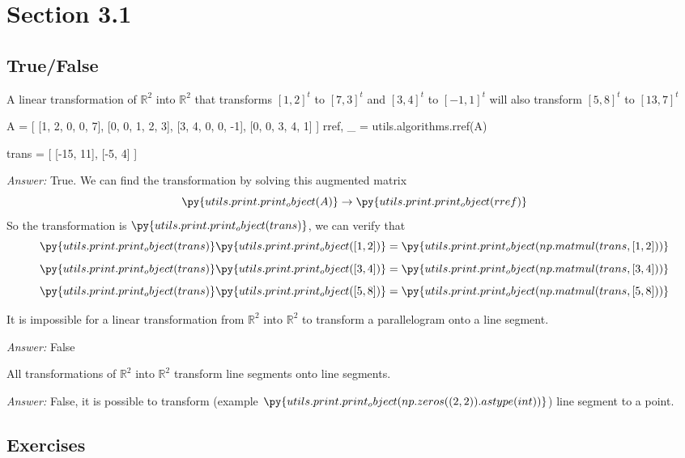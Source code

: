 \documentclass[letterpaper]{article}
\newcommand{\ans}{\textit{Answer: }}
\newenvironment{question}[2][Question]{\begin{trivlist}
\item[\hskip \labelsep {\bfseries #1}\hskip \labelsep {\bfseries #2.}]}{\end{trivlist}}
\newcommand{\printobj}[1]{\py{utils.print.print_object(#1)}}
\begin{document}
\section{Section 3.1}
\subsection{True/False}

\begin{question}{3.1}
    A linear transformation of $\mathbb { R } ^ { 2 }$ into $\mathbb { R } ^ { 2 }$
    that transforms $[ 1,2 ] ^ { t }$ to $[ 7,3 ] ^ { t }$ and $[ 3,4 ] ^ { t }$
    to $[ - 1,1 ] ^ { t }$ will also transform $[ 5,8 ] ^ { t }$ to $[ 13,7 ] ^ { t }$

\begin{pycode}
A = [
    [1, 2, 0, 0, 7],
    [0, 0, 1, 2, 3],
    [3, 4, 0, 0, -1],
    [0, 0, 3, 4, 1]
]
rref, _ = utils.algorithms.rref(A)

trans = [
    [-15, 11],
    [-5, 4]
]
\end{pycode}

    \ans True. We can find the transformation by solving this augmented matrix
    $$\printobj{A} \rightarrow \printobj{rref}$$
    So the transformation is $\printobj{trans}$, we can verify that
    $$\printobj{trans} \printobj{[1, 2]} = \printobj{np.matmul(trans, [1, 2])}$$
    $$\printobj{trans} \printobj{[3, 4]} = \printobj{np.matmul(trans, [3, 4])}$$
    $$\printobj{trans} \printobj{[5, 8]} = \printobj{np.matmul(trans, [5, 8])}$$
\end{question}

\begin{question}{3.4}
    It is impossible for a linear transformation from $\mathbb { R } ^ { 2 }$ 
    into $\mathbb { R } ^ { 2 }$ to transform a parallelogram onto a line segment.

    \ans False
\end{question}

\begin{question}{3.5}
    All transformations of $\mathbb { R } ^ { 2 }$ into $\mathbb { R } ^ { 2 }$ 
    transform line segments onto line segments.

    \ans False, it is possible to transform (example $\printobj{np.zeros((2, 2)).astype(int)}$)
    line segment to a point.
\end{question}

\subsection{Exercises}
\end{document}
